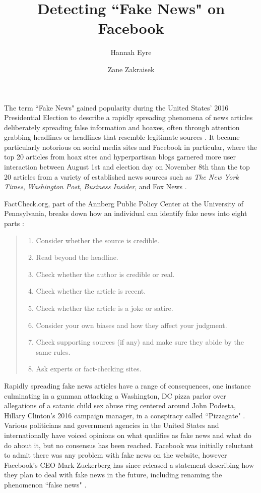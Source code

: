\documentclass[12pt]{article}
\title{Detecting ``Fake News" on Facebook}
\author{Hannah Eyre \and Zane Zakraisek}
\begin{document}
\maketitle
{}

The term ``Fake News" gained popularity during the United States' 2016 Presidential Election to describe a rapidly spreading phenomena of news articles deliberately spreading false information and hoaxes, often through attention grabbing headlines or headlines that resemble legitimate sources \citep{guardian}. It became particularly notorious on social media sites and Facebook in particular, where the top 20 articles from hoax sites and hyperpartisan blogs garnered more user interaction between August 1st and election day on November 8th than the top 20 articles from a variety of established news sources such as {\it The New York Times}, {\it Washington Post}, {\it Business Insider}, and Fox News \citep{buzzfeed}.

FactCheck.org, part of the Annberg Public Policy Center at the University of Pennsylvania, breaks down how an individual can identify fake news into eight parts \citep{factcheck}:
\begin{quote}
\begin{enumerate}
\item Consider whether the source is credible.
\item Read beyond the headline.
\item Check whether the author is credible or real.
\item Check whether the article is recent.
\item Check whether the article is a joke or satire.
\item Consider your own biases and how they affect your judgment.
\item Check supporting sources (if any) and make sure they abide by the same rules.
\item Ask experts or fact-checking sites.
\end{enumerate}
\end{quote}

Rapidly spreading fake news articles have a range of consequences, one instance culminating in a gunman attacking a Washington, DC pizza parlor over allegations of a satanic child sex abuse ring centered around John Podesta, Hillary Clinton's 2016 campaign manager, in a conspiracy called ``Pizzagate" \citep{pizzagate}. Various politicians and government agencies in the United States and internationally have voiced opinions on what qualifies as fake news and what do do about it, but no consensus has been reached. Facebook was initially reluctant to admit there was any problem with fake news on the website, however Facebook's CEO Mark Zuckerberg has since released a statement describing how they plan to deal with fake news in the future, including renaming the phenomenon ``false news" \citep{zuckerberg}.
\end{document}
